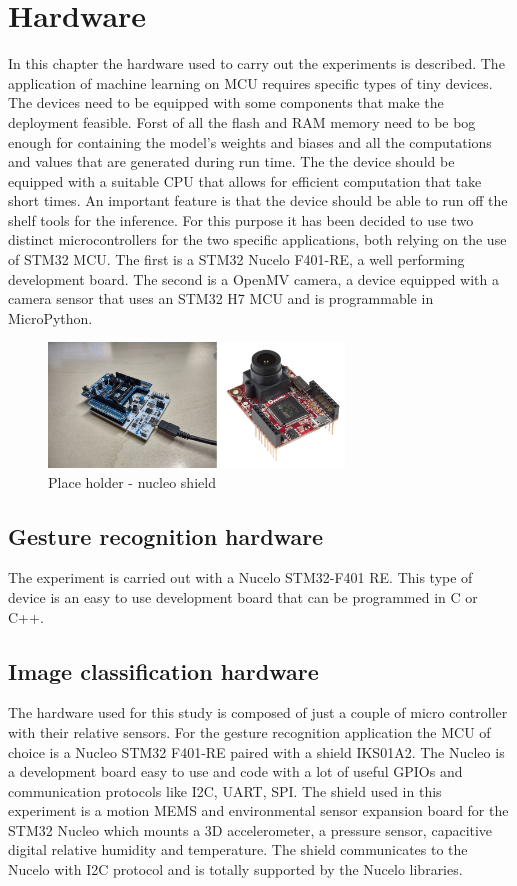 \documentclass[12pt]{report}
\begin{document}
\chapter{Hardware} 
In this chapter the hardware used to carry out the experiments is described. The application of machine learning on MCU requires specific types of tiny devices. The devices need to be equipped with some components that make the deployment feasible. Forst of all the flash and RAM memory need to be bog enough for containing the model's weights and biases and all the computations and values that are generated during run time. The the device should be equipped with a suitable CPU that allows for efficient computation that take short times. An important feature is that the device should be able to run off the shelf tools for the inference. For this purpose it has been decided to use two distinct microcontrollers for the two specific applications, both relying on the use of STM32 MCU. The first is a STM32 Nucelo F401-RE, a well performing development board. The second is a OpenMV camera, a device equipped with a camera sensor that uses an STM32 H7 MCU and is programmable in MicroPython. 
%
\begin{figure}[h!]
    \centering
    \includegraphics[width=0.7\textwidth]{Figures/Chapter2/hardware.jpg} 
    \caption{Place holder - nucleo shield}
    \label{fig:hardware_stm}    
\end{figure}
%

\section{Gesture recognition hardware}
The experiment is carried out with a Nucelo STM32-F401 RE. This type of device is an easy to use development board that can be programmed in C or C++.  

\section{Image classification hardware}


The hardware used for this study is composed of just a couple of micro controller with their relative sensors. For the gesture recognition application the MCU of choice is a Nucleo STM32 F401-RE paired with a shield IKS01A2. The Nucleo is a development board easy to use and code with a lot of useful GPIOs and communication protocols like I2C, UART, SPI. The shield \autocite{shield_web_page} used in this experiment is a motion MEMS and environmental sensor expansion board for the STM32 Nucleo which mounts a 3D accelerometer, a pressure sensor, capacitive digital relative humidity and temperature. The shield communicates to the Nucelo with I2C protocol and is totally supported by the Nucelo libraries. 
\end{document}
